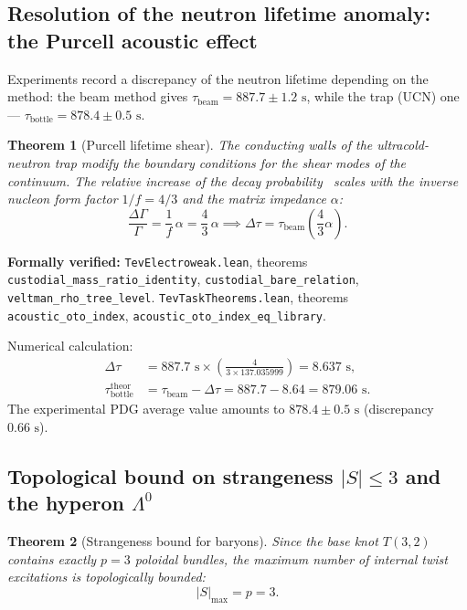 \documentclass[11pt,a4paper]{article}
\newtheorem{theorem}{Theorem}
\theoremstyle{definition}
\theoremstyle{remark}
\begin{document}
\subsection{Resolution of the neutron lifetime anomaly: the Purcell acoustic effect}

Experiments record a discrepancy of the neutron lifetime depending on the method: the beam method gives $\tau_{\mathrm{beam}} = 887.7 \pm 1.2\text{ s}$, while the trap (UCN) one --- $\tau_{\mathrm{bottle}} = 878.4 \pm 0.5\text{ s}$.
	
\begin{theorem}[Purcell lifetime shear]
\label{thm:purcell_lifetime_shift}
The conducting walls of the ultracold-neutron trap modify the boundary conditions for the shear modes of the continuum. The relative increase of the decay probability~\cite{Purcell1946} scales with the inverse nucleon form factor $1/f = 4/3$ and the matrix impedance $\alpha$:
\begin{equation}
	\frac{\Delta \Gamma}{\Gamma} = \frac{1}{f} \, \alpha = \frac{4}{3} \, \alpha \implies \Delta \tau = \tau_{\mathrm{beam}} \left( \frac{4}{3}\alpha \right).
\label{eq:purcell_tau_shift}
\end{equation}
\end{theorem}

\noindent\small\textbf{Formally verified:} \texttt{TevElectroweak.lean}, theorems \texttt{custodial_mass_ratio_identity}, \texttt{custodial_bare_relation}, \texttt{veltman_rho_tree_level}. \texttt{TevTaskTheorems.lean}, theorems \texttt{acoustic\_oto\_index}, \texttt{acoustic\_oto\_index\_eq\_library}.

Numerical calculation:
\begin{align}
	\Delta \tau &= 887.7\text{ s} \times \left( \frac{4}{3 \times 137.035999} \right) = 8.637\text{ s}, \\
	\tau_{\mathrm{bottle}}^{\mathrm{theor}} &= \tau_{\mathrm{beam}} - \Delta \tau = 887.7 - 8.64 = 879.06\text{ s}.
\label{eq:tau_bottle_prediction}
\end{align}
The experimental PDG average value amounts to $878.4 \pm 0.5\text{ s}$ (discrepancy $0.66\text{ s}$).
	
\subsection{Topological bound on strangeness $|S| \le 3$ and the hyperon $\Lambda^0$}
	
\begin{theorem}[Strangeness bound for baryons]
\label{thm:strangeness_limit_three}
Since the base knot $T(3,2)$ contains exactly $p=3$ poloidal bundles, the maximum number of internal twist excitations is topologically bounded:
\begin{equation}
	|S|_{\mathrm{max}} = p = 3.
\label{eq:strangeness_bound_exact}
\end{equation}
\end{theorem}
\end{document}
